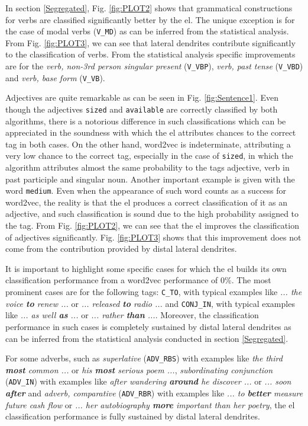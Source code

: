 {In section \ref{Segregated}, Fig. \ref{fig:PLOT2} shows that grammatical constructions for verbs are classified significantly better by the \gls{el}. The unique exception is for the case of modal verbs (\texttt{V\_MD}) as can be inferred from the statistical analysis.
From Fig. \ref{fig:PLOT3}, we can see that lateral dendrites contribute significantly to the classification of verbs.
From the statistical analysis specific improvements are for the \emph{verb, non-3rd person singular present} (\texttt{V\_VBP}), \emph{verb, past tense } (\texttt{V\_VBD}) and \emph{verb, base form} (\texttt{V\_VB}).

Adjectives are quite remarkable as can be seen in Fig. \ref{fig:Sentence1}. Even though the adjectives \texttt{sized} and \texttt{available} are correctly classified by both algorithms, there is a notorious difference in such classifications which can be appreciated in the soundness with which the \gls{el} attributes chances to the correct tag in both cases. On the other hand, word2vec is  indeterminate, attributing a very low chance to the correct tag, especially in the case of \texttt{sized}, in which the algorithm attributes almost the same probability to the tags adjective, verb in past participle and singular noun. Another important example is given with the word \texttt{medium}. Even when the appearance of such word counts as a success for word2vec, the reality is that the \gls{el} produces a correct classification of it as an adjective, and such classification is sound due to the high probability assigned to the tag. From Fig. \ref{fig:PLOT2}, we can see that the \gls{el} improves the classification of adjectives significantly. Fig. \ref{fig:PLOT3} shows that this improvement does not come from the contribution provided by distal lateral dendrites.

It is important to highlight some specific cases for which the \gls{el} builds its own classification performance from a word2vec performance of 0\%. 
The most prominent cases are for the following tags:
\texttt{C\_TO}, with typical examples like \emph{... the voice \textbf{to} renew ...} or \emph{... released \textbf{to} radio ...} and
\texttt{CONJ\_IN}, with typical examples like \emph{... as well \textbf{as} ...} or \emph{... rather \textbf{than} ...}.
Moreover, the classification performance in such cases is completely sustained by distal lateral dendrites as can be inferred from the statistical analysis conducted in section \ref{Segregated}.

For some adverbs, such as
\emph{superlative} (\texttt{ADV\_RBS}) with examples like \emph{the third \textbf{most} common ...} or \emph{his \textbf{most} serious poem ...}, \emph{subordinating conjunction} (\texttt{ADV\_IN}) with examples like \emph{after wandering \textbf{around} he discover ...} or \emph{... soon \textbf{after}} and \emph{adverb, comparative} (\texttt{ADV\_RBR}) with examples like \emph{... to \textbf{better} measure future cash flow} or \emph{... her autobiography \textbf{more} important than her poetry}, the \gls{el} classification performance is fully sustained by distal lateral dendrites.

}
